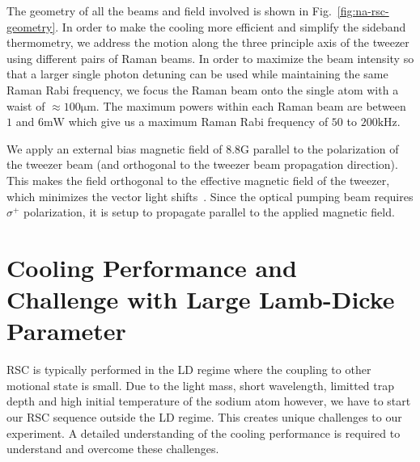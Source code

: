 The geometry of all the beams and field involved is shown in Fig.~\ref{fig:na-rsc-geometry}.
In order to make the cooling more efficient and simplify the sideband thermometry,
we address the motion along the three principle axis of the tweezer using different pairs
of Raman beams.
In order to maximize the beam intensity so that a larger single photon detuning can be used
while maintaining the same Raman Rabi frequency,
we focus the Raman beam onto the single atom with a waist of $\approx100 \mathrm{\mu m}$.
The maximum powers within each Raman beam are between $1$ and $6 \mathrm{mW}$
which give us a maximum Raman Rabi frequency of $50$ to $200 \mathrm{kHz}$.

We apply an external bias magnetic field of $8.8 \mathrm{G}$ parallel to the polarization
of the tweezer beam (and orthogonal to the tweezer beam propagation direction).
This makes the field orthogonal to the effective magnetic field of the tweezer,
which minimizes the vector light shifts~\cite{kaufman_cooling_2012,thompson_coherence_2013}.
Since the optical pumping beam requires $\sigma^+$ polarization,
it is setup to propagate parallel to the applied magnetic field.

\section{Cooling Performance and Challenge with Large Lamb-Dicke Parameter}
\label{ch:rsc-challenges}

RSC is typically performed in the LD regime where the coupling
to other motional state is small.
Due to the light mass, short wavelength, limitted trap depth and high initial temperature
of the sodium atom however, we have to start our RSC sequence outside the LD regime.
This creates unique challenges to our experiment.
A detailed understanding of the cooling performance is required to understand
and overcome these challenges.

